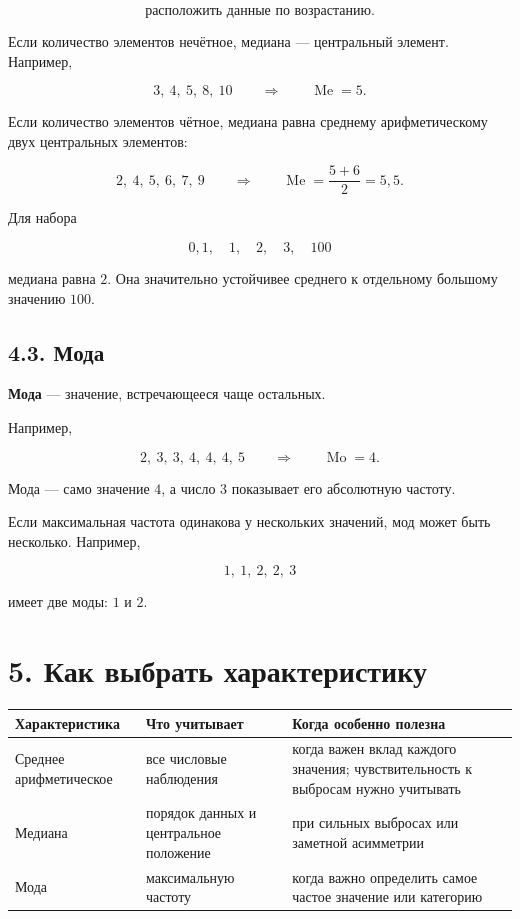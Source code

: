 \documentclass[a4paper,12pt]{article}
\newcommand{\key}[1]{\textcolor{darkaccent}{\textbf{#1}}}
\newcommand{\Me}{\operatorname{Me}}
\newcommand{\Mo}{\operatorname{Mo}}
\begin{document}
\[
\boxed{\text{расположить данные по возрастанию}}.
\]

Если количество элементов нечётное, медиана --- центральный элемент. Например,

\[
3,\ 4,\ 5,\ 8,\ 10
\qquad\Longrightarrow\qquad
\Me=5.
\]

Если количество элементов чётное, медиана равна среднему арифметическому двух центральных элементов:

\[
2,\ 4,\ 5,\ 6,\ 7,\ 9
\qquad\Longrightarrow\qquad
\Me=\frac{5+6}{2}=5{,}5.
\]

Для набора

\[
0{,}1,\quad 1,\quad 2,\quad 3,\quad 100
\]

медиана равна $2$. Она значительно устойчивее среднего к отдельному большому значению $100$.

\subsection*{4.3. Мода}

\key{Мода} --- значение, встречающееся чаще остальных.

Например,

\[
2,\ 3,\ 3,\ 4,\ 4,\ 4,\ 5
\qquad\Longrightarrow\qquad
\Mo=4.
\]

Мода --- само значение $4$, а число $3$ показывает его абсолютную частоту.

Если максимальная частота одинакова у нескольких значений, мод может быть несколько. Например,

\[
1,\ 1,\ 2,\ 2,\ 3
\]

имеет две моды: $1$ и $2$.

\section*{5. Как выбрать характеристику}

\begin{center}
\renewcommand{\arraystretch}{1.35}
\begin{tabularx}{\linewidth}{@{}lXX@{}}
\toprule
\textbf{Характеристика} & \textbf{Что учитывает} & \textbf{Когда особенно полезна} \\
\midrule
Среднее арифметическое & все числовые наблюдения & когда важен вклад каждого значения; чувствительность к выбросам нужно учитывать \\
Медиана & порядок данных и центральное положение & при сильных выбросах или заметной асимметрии \\
Мода & максимальную частоту & когда важно определить самое частое значение или категорию \\
\bottomrule
\end{tabularx}
\end{center}
\end{document}

